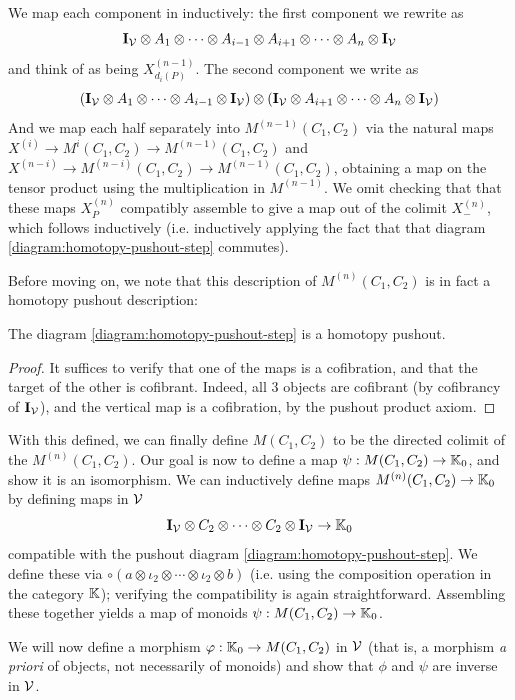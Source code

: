 \documentclass[12pt]{amsart}
\begin{document}
We map each component in inductively: the first component we  rewrite as 
$$\mathbf{I}_\mathcal{V} \otimes A_1 \otimes \cdots \otimes A_{i-1 } \otimes A_{i + 1} \otimes \cdots \otimes A_n \otimes \mathbf{I}_\mathcal{V} 
$$
and think of as being $X^{(n-1)}_{d_i(P)}$. The second component we write as 
$$\left( \mathbf{I}_\mathcal{V} \otimes A_1 \otimes \cdots \otimes A_{i-1} \otimes \mathbf{I}_\mathcal{V} \right) \otimes \left( \mathbf{I}_\mathcal{V} \otimes A_{i+1} \otimes \cdots \otimes A_n \otimes \mathbf{I}_\mathcal{V} \right)
$$
And we map each half separately into $M^{(n-1)}(C_1,C_2)$ via the natural maps $X^{(i)} \to M^{i}(C_1,C_2) \to M^{(n-1)}(C_1,C_2)$ and $X^{(n-i)} \to M^{(n-i)}(C_1,C_2) \to M^{(n-1)}(C_1,C_2)$, obtaining a map on the tensor product using the multiplication in $M^{(n-1)}$. 
We omit checking that that these maps $X^{(n)}_P$ compatibly assemble to give a map out of the colimit $X^{(n)}_{-}$, which follows inductively (i.e. inductively applying the fact that that diagram \eqref{diagram:homotopy-pushout-step} commutes).
\par 
Before moving on, we note that this description of $M^{(n)}(C_1,C_2)$ is in fact a homotopy pushout description:
\begin{lemma}\label{lem:homotopy-pushout-monoid}
	The diagram \eqref{diagram:homotopy-pushout-step} is a homotopy pushout.
\end{lemma}
\begin{proof}
	It suffices to verify that one of the maps is a cofibration, and that the target of the other is cofibrant. Indeed, all $3$ objects are cofibrant (by cofibrancy of $\mathbf{I}_\mathcal{V}$), and the vertical map is a cofibration, by the pushout product axiom.
\end{proof}
With this defined, we can finally define $M(C_1,C_2)$ to be the directed colimit of the $M^{(n)}(C_1,C_2)$. Our goal is now to define a map $\psi: M(C_1,C_2) \to \mathbb{K}_0$, and show it is an isomorphism.
We can inductively define maps $M^{(n)}(C_1,C_2) \to \mathbb{K}_0$ by defining maps in $\mathcal{V}$
$$\mathbf{I}_\mathcal{V} \otimes C_2 \otimes \cdots \otimes C_2 \otimes \mathbf{I}_\mathcal{V}  \to \mathbb{K}_0$$
compatible with the pushout diagram \eqref{diagram:homotopy-pushout-step}.
We define these via $\circ (a \otimes \iota_2 \otimes \cdots \otimes \iota_2 \otimes b)$ (i.e. using the composition operation in the category $\mathbb{K}$); verifying the compatibility is again straightforward.
Assembling these together yields a map of monoids $\psi: M(C_1,C_2) \to \mathbb{K}_0$. 
\par 
We will now define a morphism $\varphi: \mathbb{K}_0 \to M(C_1,C_2)$ in $\mathcal{V}$ (that is, a morphism \textit{a priori} of objects, not necessarily of monoids) and show that $\phi$ and $\psi$ are inverse in $\mathcal{V}$. 
\end{document}
